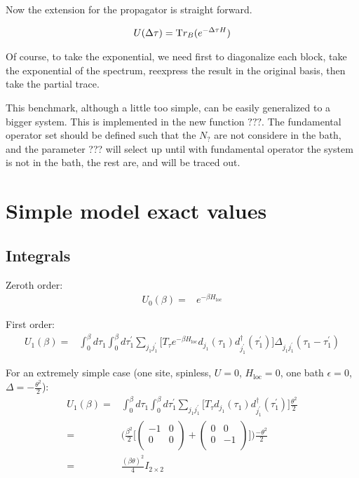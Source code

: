 \documentclass[10pt,letter]{article}
\begin{document}
Now the extension for the propagator is straight forward. 

\begin{align}
U(\Delta\tau)
=
\text Tr_B (e^{-\Delta\tau H})
\end{align}

Of course, to take the exponential, we need first to diagonalize each block, take the exponential of the spectrum, reexpress the result in the original basis, then take the partial trace. 

This benchmark, although a little too simple, can be easily generalized to a bigger system. This is implemented in the new function $???$. The fundamental operator set should be defined such that the $N_?$ are not considere in the bath, and the parameter ??? will select up until with fundamental operator the system is not in the bath, the rest are, and will be traced out. 









\section{Simple model exact values}

\subsection{Integrals}

Zeroth order: 
\begin{align}
U_0(\beta)=&  e^{-\beta H_\mathrm{loc}}
\label{eq::zeroth_order}
\end{align}

First order: 
\begin{align}
U_1(\beta)=&  \int_{0}^{\beta} d \tau_1 \int_0^{\beta} d \tau_1^{\prime}
\sum_{j_1 j_1^\prime}  
\Big[ T_{\tau} e^{-\beta H_\mathrm{loc}}
d_{j_1}(\tau_1) d_{j_1^\prime}^{\dagger} (\tau_1^\prime) \Big] \Delta_{j_1 j_1^\prime} ( \tau_1 - \tau_1^\prime)
\end{align}

For an extremely simple case (one site, spinless, $U=0$, $H_\text{loc}=0$, one bath $\epsilon=0$, $\Delta=-\frac{\theta^2}{2}$):
\begin{align}
U_1(\beta)=& \int_{0}^{\beta} d \tau_1 \int_0^{\beta} d \tau_1^{\prime} \sum_{j_1 j_1^\prime} 
\Big[ T_{\tau} d_{j_1}(\tau_1) d_{j_1^\prime}^{\dagger} (\tau_1^\prime) \Big]   
\frac{\theta^2}{2}
\\
=& 
\Bigg(\frac{\beta^2}{2}
\Bigg[  
\begin{pmatrix} -1&0\\ 0&0\\ \end{pmatrix}
+
\begin{pmatrix} 0&0\\ 0&-1\\ \end{pmatrix}
\Bigg]  
\Bigg) 
\frac{-\theta^2}{2}
\\
=& \frac{(\beta \theta)^2}{4} I_{2 \times 2}
\label{eq::first_order}
\end{align}
\end{document}
